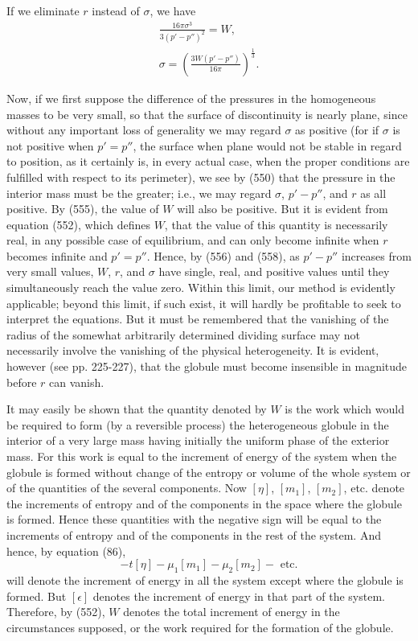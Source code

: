 \documentclass[12pt]{article}
\begin{document}
{If we eliminate $r$ instead of $\sigma$, we have
\begin{gather}
\frac{16 \pi \sigma^3}{3(p'-p'')^2} = W,  \label{557} \\
\sigma = \left( \frac{3W(p'-p'')}{16\pi}\right)^{\frac{1}{3}}.  \label{558} \end{gather}

Now, if we first suppose the difference of the pressures in the homogeneous masses to be very small, so that the surface of discontinuity is nearly plane, since without any important loss of generality we may regard $\sigma$ as positive (for if $\sigma$ is not positive when $p'=p''$, the surface when plane would not be stable in regard to position, as it certainly is, in every actual case, when the proper conditions are fulfilled with respect to its perimeter), we see by (550) that the pressure in the interior mass must be the greater; i.e., we may regard $\sigma$, $p'-p''$, and $r$ as all positive. By (555), the value of $W$ will also be positive. But it is evident from equation (552), which defines $W$, that the value of this quantity is necessarily real, in any possible case of equilibrium, and can only become infinite when $r$ becomes infinite and $p'=p''$. Hence, by (556) and (558), as $p'-p''$ increases from very small values, $W$, $r$, and $\sigma$ have single, real, and positive values until they simultaneously reach the value zero. Within this limit, our method is evidently applicable; beyond this limit, if such exist, it will hardly be profitable to seek to interpret the equations. But it must be remembered that the vanishing of the radius of the somewhat arbitrarily determined dividing surface may not necessarily involve the vanishing of the physical heterogeneity. It is evident, however (see pp. 225-227), that the globule must become insensible in magnitude before $r$ can vanish.

It may easily be shown that the quantity denoted by $W$ is the work which would be required to form (by a reversible process) the heterogeneous globule in the interior of a very large mass having initially the uniform phase of the exterior mass. For this work is equal to the increment of energy of the system when the globule is formed without change of the entropy or volume of the whole system or of the quantities of the several components. Now $[\eta]$, $[m_1]$, $[m_2]$, etc. denote the increments of entropy and of the components in the space where the globule is formed. Hence these quantities with the negative sign will be equal to the increments of entropy and of the components in the rest of the system. And hence, by equation (86),
$$ -t[\eta] -\mu_1[m_1] -\mu_2[m_2]-\text{ etc.}$$
will denote the increment of energy in all the system except where the globule is formed. But $[\epsilon]$ denotes the increment of energy in that part of the system. Therefore, by (552), $W$ denotes the total increment of energy in the circumstances supposed, or the work required for the formation of the globule.

}
\end{document}
